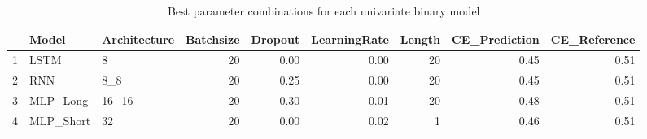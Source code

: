 \begin{table}[ht]
\centering
\begin{tabular}{rllrrrrrr}
  \hline
 & Model & Architecture & Batchsize & Dropout & LearningRate & Length & CE\_Prediction & CE\_Reference \\ 
  \hline
1 & LSTM & 8 &  20 & 0.00 & 0.00 &  20 & 0.45 & 0.51 \\ 
  2 & RNN & 8\_8 &  20 & 0.25 & 0.00 &  20 & 0.45 & 0.51 \\ 
  3 & MLP\_Long & 16\_16 &  20 & 0.30 & 0.01 &  20 & 0.48 & 0.51 \\ 
  4 & MLP\_Short & 32 &  20 & 0.00 & 0.02 &   1 & 0.46 & 0.51 \\ 
   \hline
\end{tabular}
\caption{Best parameter combinations for each univariate binary model} 
\label{tab:best_models}
\end{table}
